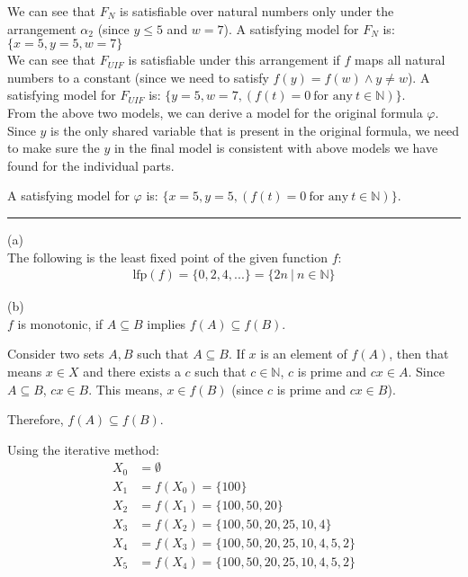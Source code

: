 \documentclass[12pt,letterpaper, onecolumn]{exam}
\begin{document}
\begin{questions}
	We can see that $F_N$ is satisfiable over natural numbers only under the arrangement $\alpha_2$ (since $y \le 5$ and $w=7$).
	A satisfying model for $F_N$ is:  $ \{x = 5, y = 5, w = 7\} $ \\

	We can see that $F_{UIF}$ is satisfiable under this arrangement if $f$ maps all natural numbers to a constant (since we need to satisfy
	$ f(y) = f(w) \land y \neq w $).
	A satisfying model for $F_{UIF}$ is: 
	$ \{y = 5, w = 7, (f(t) = 0 \: \text{for any} \: t \in \mathbb{N})\} $.  \\

	From the above two models, we can derive a model for the original formula $ \varphi $.
	Since $y$ is the only shared variable that is present in the original formula, we need to make sure the 
	$y$ in the final model is consistent with above models we have found for the individual parts.

	A satisfying model for $ \varphi $ is: $ \{x = 5, y = 5, (f(t) = 0 \: \text{for any} \: t \in \mathbb{N}) \} $.

    {\rule{17cm}{0.4pt}}

	\question[]
	\solutiontitle

	(a) \\
	The following is the least fixed point of the given function $f$:
	\begin{align*}
		\text{lfp}(f) = \{0, 2, 4, ...\} = \{2n \:|\: n \in \mathbb{N}\}
	\end{align*}

	(b) \\
	$f$ is monotonic, if $A \subseteq B$ implies $f(A) \subseteq f(B)$.

	Consider two sets $A, B$ such that $A \subseteq B$.
	If $x$ is an element of $f(A)$, then that means $x \in X$ and there exists a $c$ such that $c \in \mathbb{N}$, $c$ is prime and $cx \in A$.
	Since $A \subseteq B$, $cx \in B$.
	This means, $x \in f(B)$ (since $c$ is prime and $cx \in B$).

	Therefore, $f(A) \subseteq f(B)$.

	Using the iterative method:
	\begin{align*}
		X_0 &= \emptyset \\
		X_1 &= f(X_0) = \{100\} \\
		X_2 &= f(X_1) = \{ 100, 50, 20 \} \\
		X_3 &= f(X_2) = \{ 100, 50, 20, 25, 10, 4 \} \\
		X_4 &= f(X_3) = \{ 100, 50, 20, 25, 10, 4, 5, 2 \} \\
		X_5 &= f(X_4) = \{ 100, 50, 20, 25, 10, 4, 5, 2 \} 
	\end{align*}


\end{questions}
\end{document}
